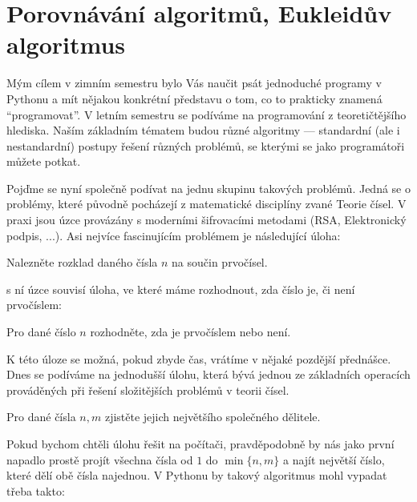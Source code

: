 \ifx\ucebnice\undefined

\setcounter{section}{0}
\fi
\section{Porovnávání algoritmů, Eukleidův algoritmus}

Mým cílem v zimním semestru bylo Vás naučit psát jednoduché programy v Pythonu a mít nějakou konkrétní představu o tom,
co to prakticky znamená ``programovat''. V letním semestru se podíváme na programování z teoretičtějšího hlediska.
Naším základním tématem budou různé algoritmy --- standardní (ale i nestandardní) postupy řešení různých problémů, 
se kterými se jako programátoři můžete potkat. 

Pojďme se nyní společně podívat na jednu skupinu takových problémů. Jedná se o problémy, které původně pocházejí z
matematické disciplíny zvané Teorie čísel. V praxi jsou úzce provázány s moderními šifrovacími metodami 
(RSA, Elektronický podpis, ...). Asi nejvíce fascinujícím problémem je následující úloha:

\begin{uloha}
Nalezněte rozklad daného čísla $n$ na součin prvočísel.
\end{uloha}

s ní úzce souvisí úloha, ve které máme rozhodnout, zda číslo je, či není prvočíslem:

\begin{uloha}
Pro dané číslo $n$ rozhodněte, zda je prvočíslem nebo není.
\end{uloha}

K této úloze se možná, pokud zbyde čas, vrátíme v nějaké pozdější přednášce. Dnes se podíváme na jednodušší úlohu, která
bývá jednou ze základních operacích prováděných při řešení složitějších problémů v teorii čísel. 

\begin{uloha}
Pro dané čísla $n,m$ zjistěte jejich největšího společného dělitele.
\end{uloha}


Pokud bychom chtěli úlohu řešit na počítači, pravděpodobně by nás jako první napadlo prostě
projít všechna čísla od $1$ do $\min \{n,m\}$ a najít největší číslo, které dělí obě čísla najednou.
V Pythonu by takový algoritmus mohl vypadat třeba takto:


